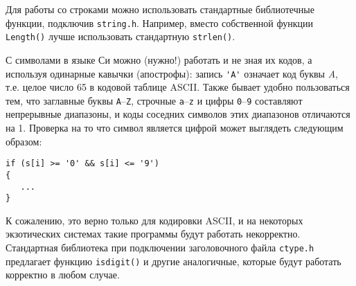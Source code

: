 Для работы со строками можно использовать стандартные библиотечные функции,
подключив \texttt{string.h}. Например, вместо собственной функции
\texttt{Length()} лучше использовать стандартную \texttt{strlen()}.

С символами в языке Си можно (нужно!) работать и не зная их кодов, а используя
одинарные кавычки (апострофы): запись \verb|'A'| означает код буквы
\textit{A}, т.е. целое число 65 в кодовой таблице ASCII. Также бывает удобно
пользоваться тем, что заглавные буквы \texttt{A}--\texttt{Z}, строчные
\texttt{a}--\texttt{z} и цифры \texttt{0}--\texttt{9} составляют непрерывные
диапазоны, и коды соседних символов этих диапазонов отличаются на 1. Проверка
на то что символ является цифрой может выглядеть следующим образом:
%
\begin{verbatim}
if (s[i] >= '0' && s[i] <= '9')
{
   ...
}
\end{verbatim}

К сожалению, это верно только для кодировки ASCII, и на некоторых экзотических
системах такие программы будут работать некорректно. Стандартная библиотека
при подключении заголовочного файла \texttt{ctype.h} предлагает функцию
\texttt{isdigit()} и другие аналогичные, которые будут работать корректно в
любом случае.
